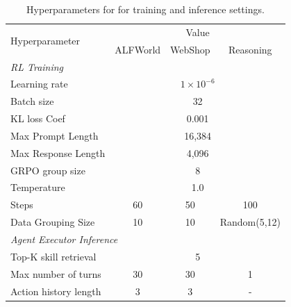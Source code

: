 \begin{table}[h]
    \caption{Hyperparameters for \ours{} for training and inference settings.}
    \begin{center}
    \begin{tabular}{lccc}
        \toprule
        \multirow{2}{*}{Hyperparameter} & \multicolumn{3}{c}{Value} \\
        &ALFWorld&WebShop&Reasoning \\
        \midrule
        \multicolumn{2}{l}{\textit{RL Training}} \\
        Learning rate & \multicolumn{3}{c}{$1 \times 10^{-6}$} \\
        Batch size & \multicolumn{3}{c}{32} \\
        KL loss Coef & \multicolumn{3}{c}{0.001} \\
        Max Prompt Length & \multicolumn{3}{c}{16,384} \\
        Max Response Length & \multicolumn{3}{c}{4,096} \\
        GRPO group size & \multicolumn{3}{c}{8} \\
        Temperature & \multicolumn{3}{c}{1.0} \\
        Steps & 60&50&100 \\
        Data Grouping Size & 10 &10& Random(5,12) \\
        \midrule
        \multicolumn{2}{l}{\textit{Agent Executor Inference}} \\
        Top-K skill retrieval & \multicolumn{3}{c}{5} \\
        Max number of turns&30&30&1 \\
        Action history length & 3&3&-\\
        \bottomrule
    \end{tabular}
    \end{center}
    \label{tab: hyperparameters}
\end{table}

